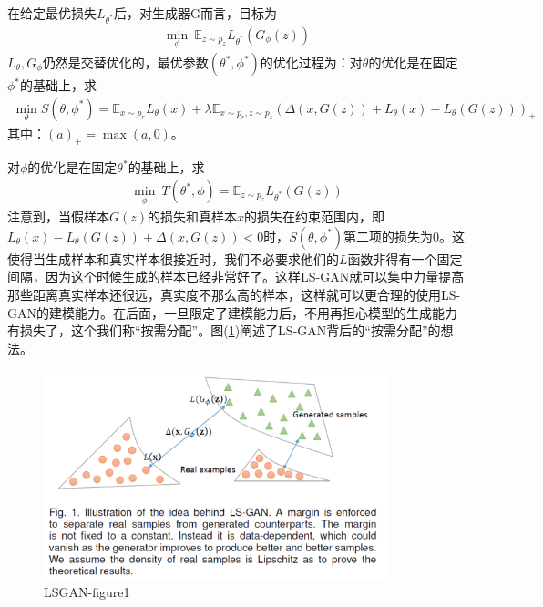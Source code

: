             \par
            在给定最优损失$L_{\theta^*}$后，对生成器G而言，目标为
            \begin{align*}
            \min_\phi \ \mathbb{E}_{z\sim p_z} L_{\theta^*}(G_\phi(z))
            \end{align*}
            $L_\theta,G_\phi$仍然是交替优化的，最优参数$(\theta^*,\phi^*)$的优化过程为：对$\theta$的优化是在固定$\phi^*$的基础上，求
            \begin{align*}
            \min _\theta S(\theta,\phi^*) = \mathbb{E}_{x\sim p_r}L_\theta(x) + \lambda \mathbb{E}_{x\sim p_r,z\sim p_z} (\Delta(x,G(z))+L_\theta(x)-L_\theta(G(z)))_+
            \end{align*}
            其中：$(a)_+ = \max(a,0)$。
            \par
            对$\phi$的优化是在固定$\theta^*$的基础上，求
            \begin{align*}
            \min _\phi \ T(\theta^*,\phi) = \mathbb{E}_{z\sim p_z}L_{\theta^*}(G(z))
            \end{align*}
            注意到，当假样本$G(z)$的损失和真样本$x$的损失在约束范围内，即$L_\theta(x) - L_\theta(G(z))+\Delta (x,G(z))<0$时，$S(\theta,\phi^*)$第二项的损失为0。这使得当生成样本和真实样本很接近时，我们不必要求他们的$L$函数非得有一个固定间隔，因为这个时候生成的样本已经非常好了。这样LS-GAN就可以集中力量提高那些距离真实样本还很远，真实度不那么高的样本，这样就可以更合理的使用LS-GAN的建模能力。在后面，一旦限定了建模能力后，不用再担心模型的生成能力有损失了，这个我们称“按需分配”。图(\ref{fig:LSGAN-figure1})阐述了LS-GAN背后的“按需分配”的想法。
                \begin{figure}[H]
                \centering
                \includegraphics[width=10cm]{images/LSGAN-figure1.jpg}
                \caption{LSGAN-figure1}
                \label{fig:LSGAN-figure1}
                \end{figure}

